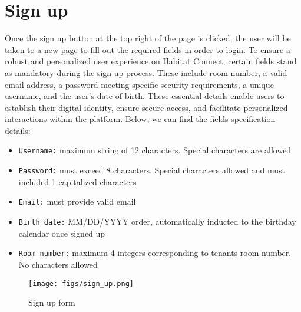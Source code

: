 \documentclass[conference]{IEEEtran}
\begin{document}
\section*{Sign up}
Once the sign up  button at the top right of the page is clicked, the user will be taken to a new page to fill out the required fields in order to login. To ensure a robust and personalized user experience on Habitat Connect, certain fields stand as mandatory during the sign-up process. These include room number, a valid email address, a password meeting specific security requirements, a unique username, and the user's date of birth. These essential details enable users to establish their digital identity, ensure secure access, and facilitate personalized interactions within the platform. Below, we can find the fields specification details:
\begin{itemize}
    \item \texttt{Username:} maximum string of 12 characters. Special characters are allowed
    \item \texttt{Password:} must exceed 8 characters. Special characters allowed and must included 1 capitalized characters
    \item \texttt{Email:} must provide valid email
    \item \texttt{Birth date:} MM/DD/YYYY order, automatically inducted to the birthday calendar once signed up
    \item \texttt{Room number:} maximum 4 integers corresponding to tenants room number. No characters allowed
\end{itemize}
    \begin{figure}[H]
    \centering
    \texttt{[image: figs/sign\_up.png]}
    \caption{Sign up form}
    \label{fig:Sign up form}
    \end{figure}
\end{document}
